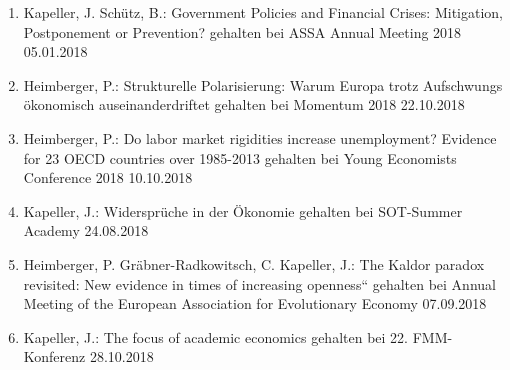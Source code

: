 \begin{enumerate}
	\item Kapeller, J. Schütz, B.: Government Policies and Financial Crises: Mitigation, Postponement or Prevention? gehalten bei ASSA Annual Meeting 2018 05.01.2018
	\item Heimberger, P.: Strukturelle Polarisierung: Warum Europa trotz Aufschwungs ökonomisch auseinanderdriftet gehalten bei Momentum 2018 22.10.2018
	\item Heimberger, P.: Do labor market rigidities increase unemployment? Evidence for 23 OECD countries over 1985-2013 gehalten bei Young Economists Conference 2018 10.10.2018
	\item Kapeller, J.: Widersprüche in der Ökonomie gehalten bei SOT-Summer Academy 24.08.2018
	\item Heimberger, P. Gräbner-Radkowitsch, C. Kapeller, J.: The Kaldor paradox revisited: New evidence in times of increasing openness“ gehalten bei Annual Meeting of the European Association for Evolutionary Economy 07.09.2018
	\item Kapeller, J.: The focus of academic economics gehalten bei 22. FMM-Konferenz 28.10.2018
\end{enumerate}
